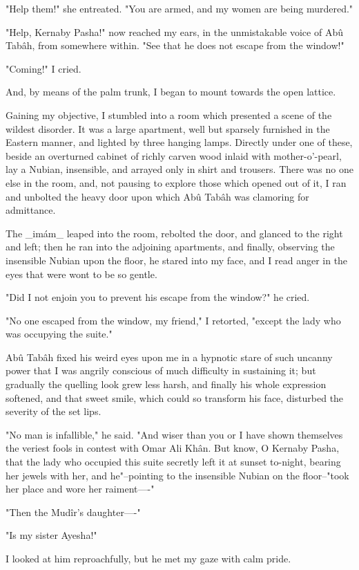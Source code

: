 "Help them!" she entreated. "You are armed, and my women are being
murdered."

"Help, Kernaby Pasha!" now reached my ears, in the unmistakable voice
of Abû Tabâh, from somewhere within. "See that he does not escape from
the window!"

"Coming!" I cried.

And, by means of the palm trunk, I began to mount towards the open
lattice.

Gaining my objective, I stumbled into a room which presented a scene
of the wildest disorder. It was a large apartment, well but sparsely
furnished in the Eastern manner, and lighted by three hanging lamps.
Directly under one of these, beside an overturned cabinet of richly
carven wood inlaid with mother-o'-pearl, lay a Nubian, insensible,
and arrayed only in shirt and trousers. There was no one else in the
room, and, not pausing to explore those which opened out of it, I ran
and unbolted the heavy door upon which Abû Tabâh was clamoring for
admittance.

The _imám_ leaped into the room, rebolted the door, and glanced to
the right and left; then he ran into the adjoining apartments, and
finally, observing the insensible Nubian upon the floor, he stared
into my face, and I read anger in the eyes that were wont to be so
gentle.

"Did I not enjoin you to prevent his escape from the window?" he
cried.

"No one escaped from the window, my friend," I retorted, "except
the lady who was occupying the suite."

Abû Tabâh fixed his weird eyes upon me in a hypnotic stare of such
uncanny power that I was angrily conscious of much difficulty in
sustaining it; but gradually the quelling look grew less harsh, and
finally his whole expression softened, and that sweet smile, which
could so transform his face, disturbed the severity of the set lips.

"No man is infallible," he said. "And wiser than you or I have shown
themselves the veriest fools in contest with Omar Ali Khân. But know,
O Kernaby Pasha, that the lady who occupied this suite secretly left
it at sunset to-night, bearing her jewels with her, and he"--pointing
to the insensible Nubian on the floor--"took her place and wore her
raiment----"

"Then the Mudîr's daughter----"

"Is my sister Ayesha!"

I looked at him reproachfully, but he met my gaze with calm pride.

